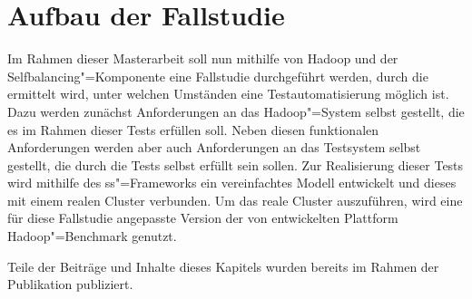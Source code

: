 \chapter{Aufbau der Fallstudie}
\label{sec:fallstudie}

Im Rahmen dieser Masterarbeit soll nun mithilfe von Hadoop und der Selfbalancing"=Komponente eine Fallstudie durchgeführt werden, durch die ermittelt wird, unter welchen Umständen eine Testautomatisierung möglich ist.
Dazu werden zunächst Anforderungen an das Hadoop"=System selbst gestellt, die es im Rahmen dieser Tests erfüllen soll.
Neben diesen funktionalen Anforderungen werden aber auch Anforderungen an das Testsystem selbst gestellt, die durch die Tests selbst erfüllt sein sollen.
Zur Realisierung dieser Tests wird mithilfe des \ac{ss}"=Frameworks ein vereinfachtes Modell entwickelt und dieses mit einem realen Cluster verbunden.
Um das reale Cluster auszuführen, wird eine für diese Fallstudie angepasste Version der von \citeauthor{zhang2016} entwickelten Plattform Hadoop"=Benchmark genutzt.

Teile der Beiträge und Inhalte dieses Kapitels wurden bereits im Rahmen der Publikation \cite{Eberhardinger2018} publiziert.








